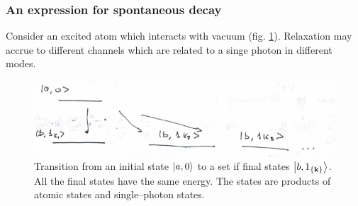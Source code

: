 \subsubsection{An expression for spontaneous decay}

Consider an excited atom which interacts with vacuum (fig. \ref{fig:relaxation}).	Relaxation may accrue to different channels which are related to a singe photon in different modes.

\begin{figure}
	\centering
	\includegraphics[width=0.7\linewidth]{fig/L8/relaxation}
	\caption{Transition from an initial state $\left\lvert {a,0} \right\rangle$ to a set if final states $\left\lvert {b, 1_{\left\{ \mathbf{k}\right\}}} \right\rangle$. All the final states have the same energy. The states are products of atomic states and single--photon states.}
	\label{fig:relaxation}
\end{figure}

